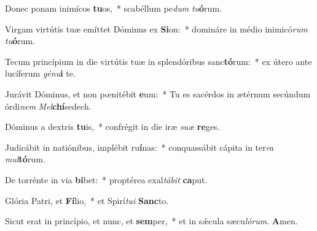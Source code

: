 \setcounter{versecount}{2}

\vs Donec ponam inimícos \textbf{tu}os,~* scabéllum pe\textit{dum} \textit{tu}\textbf{ó}rum.

\vs Virgam virtútis tuæ emíttet Dóminus ex \textbf{Si}on:~* domináre in médio inimicó\textit{rum} \textit{tu}\textbf{ó}rum.

\vs Tecum princípium in die virtútis tuæ in splendóribus sanc\textbf{tó}rum:~* ex útero ante lucíferum \textit{gé}\textit{nu}\textbf{i} te.

\vs Jurávit Dóminus, et non pœnitébit \textbf{e}um:~* Tu es sacérdos in ætérnum secúndum órdi\textit{nem} \textit{Mel}\textbf{chí}sedech.

\vs Dóminus a dextris \textbf{tu}is,~* confrégit in die iræ \textit{su}\textit{æ} \textbf{re}ges.

\vs Judicábit in natiónibus, implébit ru\textbf{í}nas:~* conquassábit cápita in ter\textit{ra} \textit{mul}\textbf{tó}rum.

\vs De torrénte in via \textbf{bi}bet:~* proptérea exal\textit{tá}\textit{bit} \textbf{ca}put.

\vs Glória Patri, et \textbf{Fí}lio,~* et Spirí\textit{tu}\textit{i} \textbf{Sanc}to.

\vs Sicut erat in princípio, et nunc, et \textbf{sem}per,~* et in sǽcula sæcu\textit{ló}\textit{rum}. \textbf{A}men.

